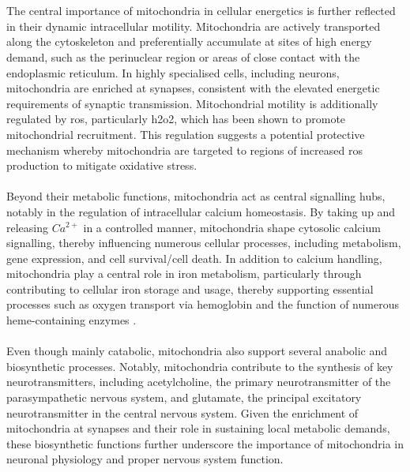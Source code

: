 \\
\\
The central importance of mitochondria in cellular energetics is further reflected in their dynamic intracellular motility. Mitochondria are actively transported along the cytoskeleton and preferentially accumulate at sites of high energy demand, such as the perinuclear region or areas of close contact with the endoplasmic reticulum\cite{casanova_mitochondria_2023, walker_nuclear-mitochondrial_2022}. In highly specialised cells, including neurons, mitochondria are enriched at synapses, consistent with the elevated energetic requirements of synaptic transmission\cite{casanova_mitochondria_2023, walker_nuclear-mitochondrial_2022}. Mitochondrial motility is additionally regulated by \gls{ros}, particularly \gls{h2o2}, which has been shown to promote mitochondrial recruitment\cite{casanova_mitochondria_2023, pak_ultrasensitive_2020}. This regulation suggests a potential protective mechanism whereby mitochondria are targeted to regions of increased \gls{ros} production to mitigate oxidative stress\cite{casanova_mitochondria_2023, pak_ultrasensitive_2020}.
\\
\\
Beyond their metabolic functions, mitochondria act as central signalling hubs, notably in the regulation of intracellular calcium homeostasis. By taking up and releasing {$Ca^{2+}$} in a controlled manner, mitochondria shape cytosolic calcium signalling, thereby influencing numerous cellular processes, including metabolism, gene expression, and cell survival/cell death\cite{casanova_mitochondria_2023, harrington_mitochondria_2023, andrieux_mitochondria_2021}. In addition to calcium handling, mitochondria play a central role in iron metabolism, particularly through contributing to cellular iron storage and usage, thereby supporting essential processes such as oxygen transport via hemoglobin and the function of numerous heme-containing enzymes \cite{casanova_mitochondria_2023, harrington_mitochondria_2023, dietz_down_2021}.
\\
\\
Even though mainly catabolic, mitochondria also support several anabolic and biosynthetic processes. Notably, mitochondria contribute to the synthesis of key neurotransmitters, including acetylcholine\cite{skok_mitochondrial_2022}, the primary neurotransmitter of the parasympathetic nervous system, and glutamate\cite{scalise_glutamine_2017}, the principal excitatory neurotransmitter in the central nervous system\cite{casanova_mitochondria_2023}. Given the enrichment of mitochondria at synapses and their role in sustaining local metabolic demands, these biosynthetic functions further underscore the importance of mitochondria in neuronal physiology and proper nervous system function.

